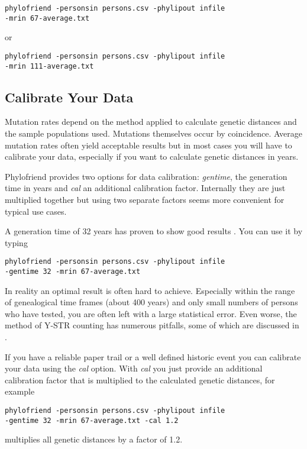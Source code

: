 \noindent\texttt{phylofriend -personsin persons.csv -phylipout infile\\
-mrin 67-average.txt}

\noindent or

\noindent\texttt{phylofriend -personsin persons.csv -phylipout infile\\
-mrin 111-average.txt}


\subsection{Calibrate Your Data}

Mutation rates depend on the method applied to calculate
genetic distances and the sample populations used. Mutations
themselves occur by coincidence. Average mutation rates
often yield acceptable results but in most cases you will
have to calibrate your data, especially if you want to
calculate genetic distances in years.

Phylofriend provides two options for data calibration:
\emph{gentime}, the generation time in years and
\emph{cal} an additional calibration factor. Internally
they are just multiplied together but using two separate
factors seems more convenient for typical use cases.

A generation time of 32 years has proven to show good
results \cite{YFullMutationRate}. You can use it by typing

\noindent\texttt{phylofriend -personsin persons.csv -phylipout infile\\
-gentime 32 -mrin 67-average.txt}

In reality an optimal result is often hard to achieve.
Especially within the range of genealogical time frames
(about 400 years) and only small numbers of persons who
have tested, you are often left with a large statistical error.
Even worse, the method of Y-STR counting has numerous
pitfalls, some of which are discussed in \cite{Ham15}.

If you have a reliable paper trail or a well defined
historic event you can calibrate your data using the
\emph{cal} option. With \emph{cal} you just provide an
additional calibration factor that is multiplied to
the calculated genetic distances, for example

\noindent\texttt{phylofriend -personsin persons.csv -phylipout infile\\
-gentime 32 -mrin 67-average.txt -cal 1.2}

multiplies all genetic distances by a factor of 1.2.



